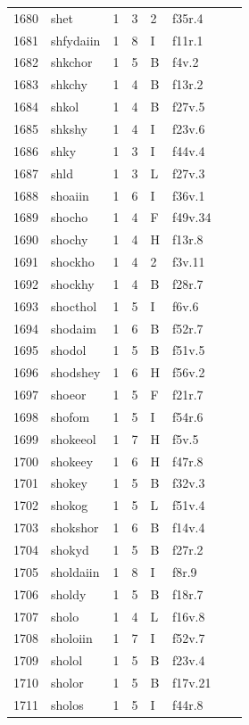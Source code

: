 \documentclass[11pt,a4paper]{article}
\begin{document}
\begin{landscape}
\begin{longtable}{@{}r>{\ttfamily}lrrl>{\ttfamily}l>{\raggedright\arraybackslash}p{80mm}>{\raggedright\arraybackslash}p{36mm}@{}}
1680 & shet & 1 & 3 & 2 & f35r.4 &  & \\
1681 & shfydaiin & 1 & 8 & I & f11r.1 &  & \\
1682 & shkchor & 1 & 5 & B & f4v.2 &  & \\
1683 & shkchy & 1 & 4 & B & f13r.2 &  & \\
1684 & shkol & 1 & 4 & B & f27v.5 &  & \\
1685 & shkshy & 1 & 4 & I & f23v.6 &  & \\
1686 & shky & 1 & 3 & I & f44v.4 &  & \\
1687 & shld & 1 & 3 & L & f27v.3 &  & \\
1688 & shoaiin & 1 & 6 & I & f36v.1 &  & \\
1689 & shocho & 1 & 4 & F & f49v.34 &  & \\
1690 & shochy & 1 & 4 & H & f13r.8 &  & \\
1691 & shockho & 1 & 4 & 2 & f3v.11 &  & \\
1692 & shockhy & 1 & 4 & B & f28r.7 &  & \\
1693 & shocthol & 1 & 5 & I & f6v.6 &  & \\
1694 & shodaim & 1 & 6 & B & f52r.7 &  & \\
1695 & shodol & 1 & 5 & B & f51v.5 &  & \\
1696 & shodshey & 1 & 6 & H & f56v.2 &  & \\
1697 & shoeor & 1 & 5 & F & f21r.7 &  & \\
1698 & shofom & 1 & 5 & I & f54r.6 &  & \\
1699 & shokeeol & 1 & 7 & H & f5v.5 &  & \\
1700 & shokeey & 1 & 6 & H & f47r.8 &  & \\
1701 & shokey & 1 & 5 & B & f32v.3 &  & \\
1702 & shokog & 1 & 5 & L & f51v.4 &  & \\
1703 & shokshor & 1 & 6 & B & f14v.4 &  & \\
1704 & shokyd & 1 & 5 & B & f27r.2 &  & \\
1705 & sholdaiin & 1 & 8 & I & f8r.9 &  & \\
1706 & sholdy & 1 & 5 & B & f18r.7 &  & \\
1707 & sholo & 1 & 4 & L & f16v.8 &  & \\
1708 & sholoiin & 1 & 7 & I & f52v.7 &  & \\
1709 & sholol & 1 & 5 & B & f23v.4 &  & \\
1710 & sholor & 1 & 5 & B & f17v.21 &  & \\
1711 & sholos & 1 & 5 & I & f44r.8 &  & \\

\end{longtable}
\end{landscape}
\end{document}
